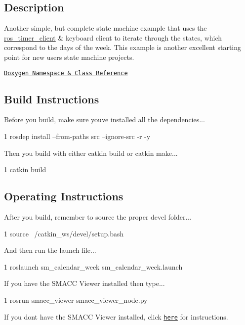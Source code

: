 

\subsection*{Description}

Another simple, but complete state machine example that uses the \hyperlink{namespaceros__timer__client}{ros\+\_\+timer\+\_\+client} \& keyboard client to iterate through the states, which correspond to the days of the week. This example is another excellent starting point for new users state machine projects.~\newline


\href{https://reelrbtx.github.io/SMACC_Documentation/master/html/namespacesm__three__some.html}{\tt Doxygen Namespace \& Class Reference}

\subsection*{Build Instructions}

Before you build, make sure you\textquotesingle{}ve installed all the dependencies...


\begin{DoxyCode}
1 rosdep install --from-paths src --ignore-src -r -y 
\end{DoxyCode}


Then you build with either catkin build or catkin make...


\begin{DoxyCode}
1 catkin build
\end{DoxyCode}


\subsection*{Operating Instructions}

After you build, remember to source the proper devel folder...


\begin{DoxyCode}
1 source ~/catkin\_ws/devel/setup.bash
\end{DoxyCode}


And then run the launch file...


\begin{DoxyCode}
1 roslaunch sm\_calendar\_week sm\_calendar\_week.launch
\end{DoxyCode}


If you have the S\+M\+A\+CC Viewer installed then type...


\begin{DoxyCode}
1 rosrun smacc\_viewer smacc\_viewer\_node.py
\end{DoxyCode}


If you don\textquotesingle{}t have the S\+M\+A\+CC Viewer installed, click \href{http://smacc.ninja/smacc-viewer/}{\tt here} for instructions. 